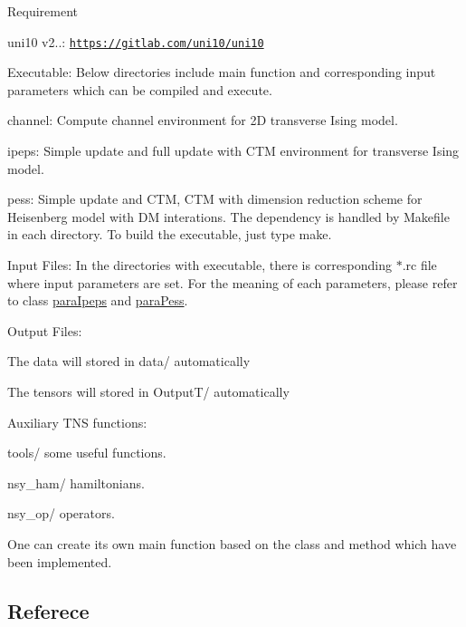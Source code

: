 \begin{DoxyItemize}
\item Requirement
\begin{DoxyItemize}
\item uni10 v2..\+: \href{https://gitlab.com/uni10/uni10}{\tt https\+://gitlab.\+com/uni10/uni10}
\end{DoxyItemize}
\item Executable\+: Below directories include main function and corresponding input parameters which can be compiled and execute.
\begin{DoxyItemize}
\item channel\+: Compute channel environment for 2D transverse Ising model.
\item ipeps\+: Simple update and full update with C\+TM environment for transverse Ising model.
\item pess\+: Simple update and C\+TM, C\+TM with dimension reduction scheme for Heisenberg model with DM interations. The dependency is handled by Makefile in each directory. To build the executable, just type {\ttfamily make}.
\end{DoxyItemize}
\item Input Files\+: In the directories with executable, there is corresponding $\ast$.rc file where input parameters are set. For the meaning of each parameters, please refer to class {\ttfamily \hyperlink{structparaIpeps}{para\+Ipeps}} and {\ttfamily \hyperlink{structparaPess}{para\+Pess}}.
\item Output Files\+:
\begin{DoxyItemize}
\item The data will stored in data/ automatically
\item The tensors will stored in Output\+T/ automatically
\end{DoxyItemize}
\item Auxiliary T\+NS functions\+:
\begin{DoxyItemize}
\item tools/ some useful functions.
\item nsy\+\_\+ham/ hamiltonians.
\item nsy\+\_\+op/ operators.
\end{DoxyItemize}
\item One can create its own main function based on the class and method which have been implemented.
\end{DoxyItemize}

\subsection*{Referece}


